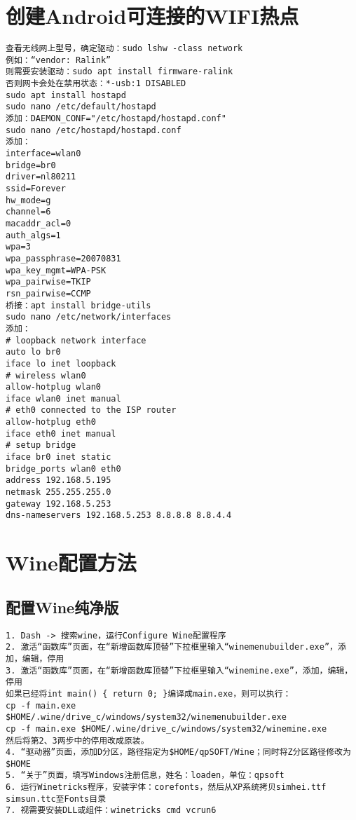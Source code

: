 \documentclass[a4paper,fontset=fandol,zihao=-4,linespread=1.2,oneside]{ctexbook}
\begin{document}
\section{创建Android可连接的WIFI热点}
\begin{lstlisting}
查看无线网上型号，确定驱动：sudo lshw -class network
例如：“vendor: Ralink”
则需要安装驱动：sudo apt install firmware-ralink
否则网卡会处在禁用状态：*-usb:1 DISABLED
sudo apt install hostapd
sudo nano /etc/default/hostapd
添加：DAEMON_CONF="/etc/hostapd/hostapd.conf"
sudo nano /etc/hostapd/hostapd.conf
添加：
interface=wlan0
bridge=br0
driver=nl80211
ssid=Forever
hw_mode=g
channel=6
macaddr_acl=0
auth_algs=1
wpa=3
wpa_passphrase=20070831
wpa_key_mgmt=WPA-PSK
wpa_pairwise=TKIP
rsn_pairwise=CCMP
桥接：apt install bridge-utils
sudo nano /etc/network/interfaces
添加：
# loopback network interface
auto lo br0
iface lo inet loopback
# wireless wlan0
allow-hotplug wlan0
iface wlan0 inet manual
# eth0 connected to the ISP router
allow-hotplug eth0
iface eth0 inet manual
# setup bridge
iface br0 inet static
bridge_ports wlan0 eth0
address 192.168.5.195
netmask 255.255.255.0
gateway 192.168.5.253
dns-nameservers 192.168.5.253 8.8.8.8 8.8.4.4
\end{lstlisting}

\section{Wine配置方法}

\subsection{配置Wine纯净版}
\begin{lstlisting}
1. Dash -> 搜索wine，运行Configure Wine配置程序
2. 激活“函数库”页面，在“新增函数库顶替”下拉框里输入“winemenubuilder.exe”，添加，编辑，停用
3. 激活“函数库”页面，在“新增函数库顶替”下拉框里输入“winemine.exe”，添加，编辑，停用
如果已经将int main() { return 0; }编译成main.exe，则可以执行：
cp -f main.exe $HOME/.wine/drive_c/windows/system32/winemenubuilder.exe
cp -f main.exe $HOME/.wine/drive_c/windows/system32/winemine.exe
然后将第2、3两步中的停用改成原装。
4. “驱动器”页面，添加D分区，路径指定为$HOME/qpSOFT/Wine；同时将Z分区路径修改为$HOME
5. “关于”页面，填写Windows注册信息，姓名：loaden，单位：qpsoft
6. 运行Winetricks程序，安装字体：corefonts，然后从XP系统拷贝simhei.ttf simsun.ttc至Fonts目录
7. 视需要安装DLL或组件：winetricks cmd vcrun6
\end{lstlisting}
\end{document}
